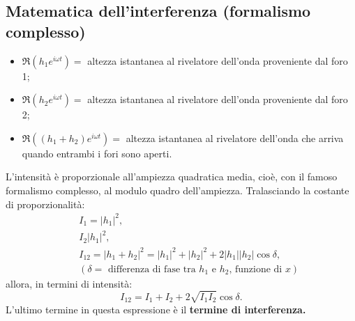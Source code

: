\documentclass[a4paper,12pt,oneside]{book}
\begin{document}
\subsection*{Matematica dell'interferenza (formalismo complesso)}
\begin{itemize}
\item $\Re{\left(h_1 e^{i\omega t} \right)}=$ altezza istantanea al rivelatore dell'onda proveniente dal foro 1;
\item $\Re{\left(h_2 e^{i\omega t} \right)}=$ altezza istantanea al rivelatore dell'onda proveniente dal foro 2;
\item $\Re{\left( \left(h_1 +h_2 \right) e^{i\omega t} \right)}=$ altezza istantanea al rivelatore dell'onda che arriva quando entrambi i fori sono aperti.
\end{itemize}
L'intensità è proporzionale all'ampiezza quadratica media, cioè, con il famoso formalismo complesso, al modulo quadro dell'ampiezza. Tralasciando la costante di proporzionalità:
\begin{eqnarray}
& &I_1= \lvert {h_1} \rvert ^2, \nonumber \\
& &I_2 \lvert {h_1} \rvert ^2, \\
& &I_{12}= \lvert {h_1+h_2} \rvert ^2= \lvert {h_1} \rvert ^2+ \lvert {h_2} \rvert ^2 + 2 \lvert {h_1} \rvert \lvert {h_2} \rvert \cos \delta ,\nonumber  \\ 
& &\left( \delta = \textrm{ differenza di fase tra } h_1 \textrm{ e } h_2 \textrm{, funzione di }x \right)\nonumber 
\end{eqnarray}
allora, in termini di intensità:
	\begin{equation}
		\boxed{
			I_{12}= I_1 + I_2 + 2 \sqrt{I_1 I_2}\cos \delta.
			}
	\end{equation}
L'ultimo termine in questa espressione è il \textbf{termine di interferenza.}
\end{document}

